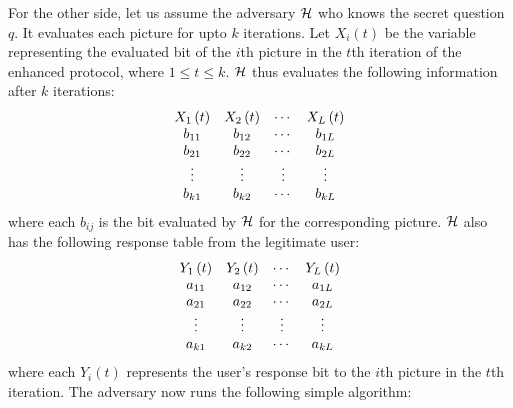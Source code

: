 \documentclass{llncs}
\begin{document}
For the other side, let us assume the adversary ${\cal H}$ who knows the secret question $q$. It evaluates each picture for upto $k$ iterations. Let $X_i \left( t \right)$ be the variable representing the evaluated bit of the $i$th picture in 
the $t$th iteration of the enhanced protocol, where $1 \le t \le k$. ${\cal H}$ thus evaluates the following information after $k$ iterations:
\[
\begin{array}{*{20}c}
   {X_1 \left( t \right)} & {X_2 \left( t \right)} &  \cdots  & {X_L \left( t \right)}  \\
   {b_{11} } & {b_{12} } &  \cdots  & {b_{1L} }  \\
   {b_{21} } & {b_{22} } &  \cdots  & {b_{2L} }  \\
    \vdots  &  \vdots  &  \vdots  &  \vdots   \\
   {b_{k1} } & {b_{k2} } &  \cdots  & {b_{kL} }  \\
\end{array}
\]
where each $b_{ij}$ is the bit evaluated by ${\cal H}$ for the corresponding picture. ${\cal H}$ also has the following response table from the legitimate user:
\[
\begin{array}{*{20}c}
   {Y_1 \left( t \right)} & {Y_2 \left( t \right)} &  \cdots  & {Y_L \left( t \right)}  \\
   {a_{11} } & {a_{12} } &  \cdots  & {a_{1L} }  \\
   {a_{21} } & {a_{22} } &  \cdots  & {a_{2L} }  \\
    \vdots  &  \vdots  &  \vdots  &  \vdots   \\
   {a_{k1} } & {a_{k2} } &  \cdots  & {a_{kL} }  \\
\end{array}
\]
where each $Y_i \left( t \right)$ represents the user's response bit to the $i$th picture in the $t$th iteration. The adversary now runs the following simple algorithm:
\end{document}
